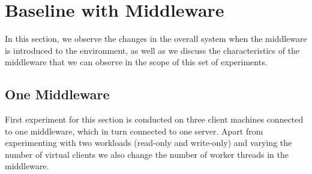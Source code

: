 \documentclass[11pt,a4paper]{article}
\begin{document}
\section{Baseline with Middleware} \label{sec:mwb}
In this section, we observe the changes in the overall system when the middleware is introduced to the environment, as well as we discuss the characteristics of the middleware that we can observe in the scope of this set of experiments. 

\subsection{One Middleware} \label{sec:mwb1}
First experiment for this section is conducted on three client machines connected to one middleware, which in turn connected to one server. Apart from experimenting with two workloads (read-only and write-only) and varying the number of virtual clients we also change the number of worker threads in the middleware.
\end{document}
